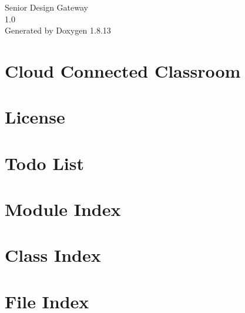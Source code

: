 \documentclass[twoside]{book}
\newcommand{\+}{\discretionary{\mbox{\scriptsize$\hookleftarrow$}}{}{}}
\newcommand{\clearemptydoublepage}{%
  \newpage{\pagestyle{empty}\cleardoublepage}%
}
\begin{document}
\hypersetup{pageanchor=false,
             bookmarksnumbered=true,
             pdfencoding=unicode
            }
\begin{titlepage}
\vspace*{7cm}
\begin{center}%
{\Large Senior Design Gateway \\[1ex]\large 1.\+0 }\\
\vspace*{1cm}
{\large Generated by Doxygen 1.8.13}\\
\end{center}
\end{titlepage}
\clearemptydoublepage
{}
\tableofcontents
\clearemptydoublepage
{}
\hypersetup{pageanchor=true}

\chapter{Cloud Connected Classroom}
\label{md_README}

\chapter{License}
\label{License}

\chapter{Todo List}
\label{todo}

\chapter{Module Index}

\chapter{Class Index}

\chapter{File Index}

\end{document}
